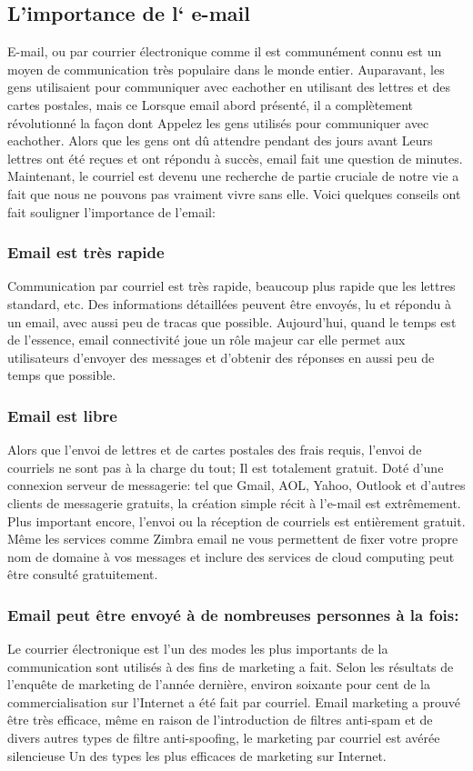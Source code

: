 \documentclass[french]{report}
\begin{document}
\subsection{\LARGE L’importance de l‘ e-mail}
\LARGE E-mail, ou par courrier électronique comme il est communément connu est un moyen de communication très populaire dans le monde entier. Auparavant, les gens utilisaient pour communiquer avec eachother en utilisant des lettres et des cartes postales, mais ce Lorsque email abord présenté, il a complètement révolutionné la façon dont Appelez les gens utilisés pour communiquer avec eachother. Alors que les gens ont dû attendre pendant des jours avant Leurs lettres ont été reçues et ont répondu à succès, email fait une question de minutes. Maintenant, le courriel est devenu une recherche de partie cruciale de notre vie a fait que nous ne pouvons pas vraiment vivre sans elle. Voici quelques conseils ont fait souligner l’importance de l’email:
\subsubsection{\LARGE Email est très rapide}
\LARGE Communication par courriel est très rapide, beaucoup plus rapide que les lettres standard, etc. Des informations détaillées peuvent être envoyés, lu et répondu à un email, avec aussi peu de tracas que possible. Aujourd’hui, quand le temps est de l’essence, email connectivité joue un rôle majeur car elle permet aux utilisateurs d’envoyer des messages et d’obtenir des réponses en aussi peu de temps que possible.
\subsubsection{\LARGE Email est libre}
\LARGE Alors que l’envoi de lettres et de cartes postales des frais requis, l’envoi de courriels ne sont pas à la charge du tout; Il est totalement gratuit. Doté d’une connexion serveur de messagerie: tel que Gmail, AOL, Yahoo, Outlook et d’autres clients de messagerie gratuits, la création simple récit à l’e-mail est extrêmement. Plus important encore, l’envoi ou la réception de courriels est entièrement gratuit. Même les services comme Zimbra email ne vous permettent de fixer votre propre nom de domaine à vos messages et inclure des services de cloud computing peut être consulté gratuitement.
\subsubsection{\LARGE Email peut être envoyé à de nombreuses personnes à la fois:}
\LARGE Le courrier électronique est l’un des modes les plus importants de la communication sont utilisés à des fins de marketing a fait. Selon les résultats de l’enquête de marketing de l’année dernière, environ soixante pour cent de la commercialisation sur l’Internet a été fait par courriel. Email marketing a prouvé être très efficace, même en raison de l’introduction de filtres anti-spam et de divers autres types de filtre anti-spoofing, le marketing par courriel est avérée silencieuse Un des types les plus efficaces de marketing sur Internet.
\end{document}
